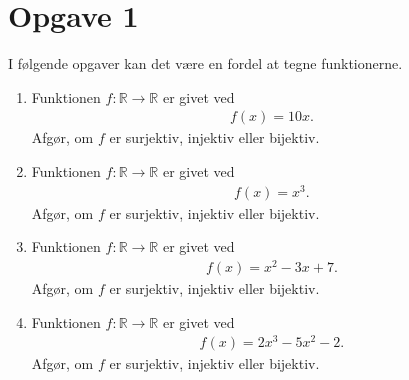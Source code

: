 \section*{Opgave 1}
I følgende opgaver kan det være en fordel at tegne funktionerne.
\begin{enumerate}[label=\roman*)]
	\item Funktionen $f:\mathbb{R} \to \mathbb{R}$ er givet ved
	\begin{align*}
		f(x) = 10x.
	\end{align*}
	Afgør, om $f$ er surjektiv, injektiv eller bijektiv. 
	\item Funktionen $f:\mathbb{R} \to \mathbb{R}$ er givet ved
	\begin{align*}
		f(x) = x^3.
	\end{align*}
	Afgør, om $f$ er surjektiv, injektiv eller bijektiv. 
	\item Funktionen $f:\mathbb{R} \to \mathbb{R}$ er givet ved
	\begin{align*}
		f(x) = x^2-3x+7.
	\end{align*}
	Afgør, om $f$ er surjektiv, injektiv eller bijektiv. 
	\item Funktionen $f:\mathbb{R} \to \mathbb{R}$ er givet ved
	\begin{align*}
		f(x) = 2x^3-5x^2-2.
	\end{align*}
	Afgør, om $f$ er surjektiv, injektiv eller bijektiv. 
\end{enumerate}


